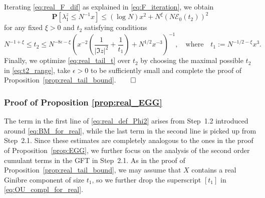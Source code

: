 \documentclass[10pt]{amsart}
\numberwithin{equation}{section}
\begin{document}
Iterating \eqref{eq:real_F_dif} as explained in \eqref{eq:F_iteration}, we obtain
\begin{equation}
\mathbf{P}[\lambda^{z}_1\le  N^{-1}x] \le (\log N) x^2 + N^\xi (N\mathcal{E}_0(t_2))^2
\label{eq:real_tail_t}
\end{equation}
for any fixed $\xi>0$ and $t_2$ satisfying conditions
\begin{equation}
N^{-1+\xi}\le t_2\le N^{-8\epsilon -\xi}\left(x^{-2}\left(\frac{1}{|\Im z|^2}+\frac{1}{t_1}\right)+N^{1/2}x^{-3}\right)^{-1},\quad\text{where}\quad t_1:=N^{-1/2-\xi}x^3.
\label{eq:t2_range}
\end{equation}
Finally, we optimize \eqref{eq:real_tail_t} over $t_2$ by choosing the maximal possible $t_2$ in \eqref{eq:t2_range}, take $\epsilon>0$ to be sufficiently small and complete the proof of Proposition~\ref{prop:real_tail_bound}.\hfill $\qed$





\subsubsection{Proof of Proposition \ref{prop:real_EGG}} The term in the first line of \eqref{eq:real_def_Phi2} arises from Step~1.2 introduced around \eqref{eq:BM_for_real}, while the last term in the second line is picked up from Step~2.1. Since these estimates are completely analogous to the ones in the proof of Proposition~\ref{prop:EGG}, we further focus on the analysis of the second order cumulant terms in the GFT in Step~2.1. As in the proof of Proposition~\ref{prop:real_tail_bound}, we may assume that $X$ contains a real Ginibre component of size $t_1$, so we further drop the superscript $[t_1]$ in \eqref{eq:OU_compl_for_real}. 
\end{document}
